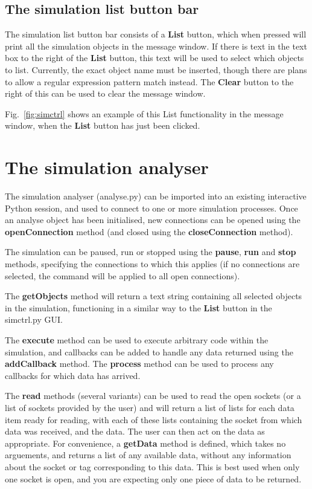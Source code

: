 \documentclass{article}
\begin{document}
\subsection{The simulation list button bar}
The simulation list button bar consists of a {\bf List} button, which
when pressed will print all the simulation objects in the message
window.  If there is text in the text box to the right of the {\bf
  List} button, this text will be used to select which objects to
list.  Currently, the exact object name must be inserted, though there
are plans to allow a regular expression pattern match instead.  
The {\bf Clear} button to the right of this can be used to clear the
message window.  

Fig.~\ref{fig:simctrl} shows an example of this List functionality in
the message window, when the {\bf List} button has just been clicked.

\section{The simulation analyser}
The simulation analyser (analyse.py) can be imported into an existing
interactive Python session, and used to connect to one or more
simulation processes.  Once an analyse object has been initialised,
new connections can be opened using the {\bf openConnection} method
(and closed using the {\bf closeConnection} method).  

The simulation can be paused, run or stopped using the {\bf pause},
{\bf run} and {\bf stop} methods, specifying the connections to which
this applies (if no connections are selected, the command will be
applied to all open connections).

The {\bf getObjects} method will return a text
string containing all selected objects in the simulation, functioning
in a similar way to the {\bf List} button in the simctrl.py GUI.  

The {\bf execute} method can be used to execute arbitrary code within
the simulation, and callbacks can be added to handle any data returned
using the {\bf addCallback} method.  The {\bf process} method can be
used to process any callbacks for which data has arrived.  

The {\bf read} methods (several variants) can be used to read the open
sockets (or a list of sockets provided by the user) and will return a
list of lists for each data item ready for reading, with each of these
lists containing the socket from which data was received, and the
data.  The user can then act on the data as appropriate.  For
convenience, a {\bf getData} method is defined, which takes no
arguements, and returns a list of any available data, without any
information about the socket or tag corresponding to this data.  This
is best used when only one socket is open, and you are expecting only
one piece of data to be returned.
\end{document}
